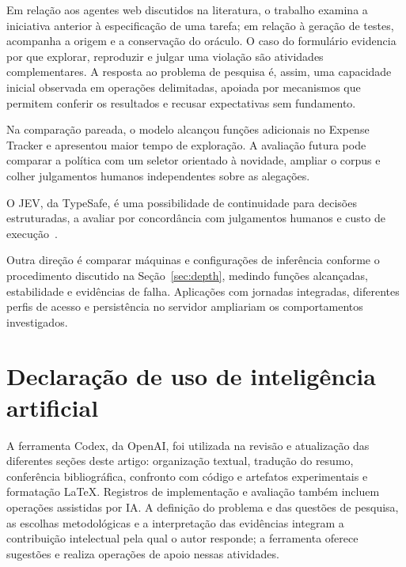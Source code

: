 \documentclass[12pt]{article}
\begin{document}
Em relação aos agentes web discutidos na literatura, o trabalho examina a iniciativa anterior à especificação de uma tarefa; em relação à geração de testes, acompanha a origem e a conservação do oráculo. O caso do formulário evidencia por que explorar, reproduzir e julgar uma violação são atividades complementares. A resposta ao problema de pesquisa é, assim, uma capacidade inicial observada em operações delimitadas, apoiada por mecanismos que permitem conferir os resultados e recusar expectativas sem fundamento.

Na comparação pareada, o modelo alcançou funções adicionais no Expense Tracker e apresentou maior tempo de exploração. A avaliação futura pode comparar a política com um seletor orientado à novidade, ampliar o corpus e colher julgamentos humanos independentes sobre as alegações.

O JEV, da TypeSafe, é uma possibilidade de continuidade para decisões estruturadas, a avaliar por concordância com julgamentos humanos e custo de execução~\cite{typesafe2026jev}.

Outra direção é comparar máquinas e configurações de inferência conforme o procedimento discutido na Seção~\ref{sec:depth}, medindo funções alcançadas, estabilidade e evidências de falha. Aplicações com jornadas integradas, diferentes perfis de acesso e persistência no servidor ampliariam os comportamentos investigados.

\section*{Declaração de uso de inteligência artificial}
A ferramenta Codex, da OpenAI, foi utilizada na revisão e atualização das diferentes seções deste artigo: organização textual, tradução do resumo, conferência bibliográfica, confronto com código e artefatos experimentais e formatação LaTeX. Registros de implementação e avaliação também incluem operações assistidas por IA. A definição do problema e das questões de pesquisa, as escolhas metodológicas e a interpretação das evidências integram a contribuição intelectual pela qual o autor responde; a ferramenta oferece sugestões e realiza operações de apoio nessas atividades.



\end{document}
